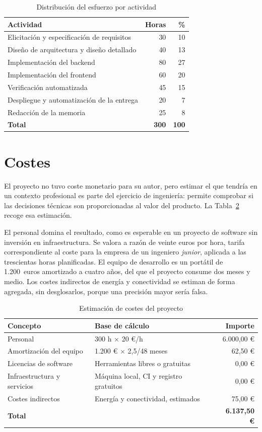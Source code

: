 \begin{table}[htbp]
\centering
\caption{Distribución del esfuerzo por actividad}
\label{tab:horas}
\begin{tabular}{lrr}
\hline
Actividad & Horas & \% \\
\hline
Elicitación y especificación de requisitos & 30 & 10 \\
Diseño de arquitectura y diseño detallado & 40 & 13 \\
Implementación del backend & 80 & 27 \\
Implementación del frontend & 60 & 20 \\
Verificación automatizada & 45 & 15 \\
Despliegue y automatización de la entrega & 20 & 7 \\
Redacción de la memoria & 25 & 8 \\
\hline
\textbf{Total} & \textbf{300} & \textbf{100} \\
\hline
\end{tabular}
\end{table}

\section{Costes}

El proyecto no tuvo coste monetario para su autor, pero estimar el que tendría en un contexto profesional es parte del ejercicio de ingeniería: permite comprobar si las decisiones técnicas son proporcionadas al valor del producto. La Tabla~\ref{tab:costes} recoge esa estimación.

El personal domina el resultado, como es esperable en un proyecto de software sin inversión en infraestructura. Se valora a razón de veinte euros por hora, tarifa correspondiente al coste para la empresa de un ingeniero \emph{junior}, aplicada a las trescientas horas planificadas. El equipo de desarrollo es un portátil de 1.200~euros amortizado a cuatro años, del que el proyecto consume dos meses y medio. Los costes indirectos de energía y conectividad se estiman de forma agregada, sin desglosarlos, porque una precisión mayor sería falsa.

\begin{table}[htbp]
\centering
\caption{Estimación de costes del proyecto}
\label{tab:costes}
\begin{tabular}{@{}p{4.1cm}p{6.0cm}r@{}}
\hline
Concepto & Base de cálculo & Importe \\
\hline
Personal & 300 h $\times$ 20 €/h & 6.000,00 € \\
Amortización del equipo & 1.200 € $\times$ 2,5/48 meses & 62,50 € \\
Licencias de software & Herramientas libres o gratuitas & 0,00 € \\
Infraestructura y servicios & Máquina local, CI y registro gratuitos & 0,00 € \\
Costes indirectos & Energía y conectividad, estimados & 75,00 € \\
\hline
\textbf{Total} & & \textbf{6.137,50 €} \\
\hline
\end{tabular}
\end{table}

